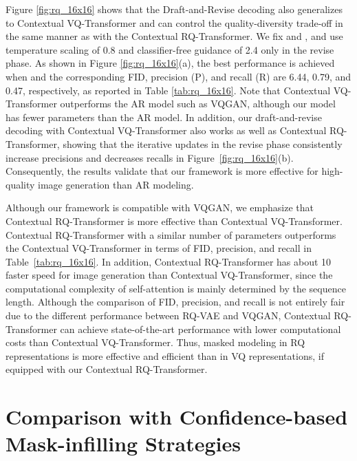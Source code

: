 \documentclass{article}
\begin{document}
Figure \ref{fig:rq_16x16} shows that the Draft-and-Revise decoding also generalizes to Contextual VQ-Transformer and can control the quality-diversity trade-off in the same manner as with the Contextual RQ-Transformer. 
We fix  and , and use temperature scaling of 0.8 and classifier-free guidance of 2.4 only in the revise phase. 
As shown in Figure \ref{fig:rq_16x16}(a), the best performance is achieved when  and the corresponding FID, precision (P), and recall (R) are 6.44, 0.79, and 0.47, respectively, as reported in Table \ref{tab:rq_16x16}.
Note that Contextual VQ-Transformer outperforms the AR model such as VQGAN, although our model has  fewer parameters than the AR model.
In addition, our draft-and-revise decoding with Contextual VQ-Transformer also works as well as Contextual RQ-Transformer, showing that the iterative updates in the revise phase consistently increase precisions and decreases recalls in Figure~\ref{fig:rq_16x16}(b).
Consequently, the results validate that our framework is more effective for high-quality image generation than AR modeling.

Although our framework is compatible with VQGAN, we emphasize that Contextual RQ-Transformer is more effective than Contextual VQ-Transformer.
Contextual RQ-Transformer with a similar number of parameters outperforms the Contextual VQ-Transformer in terms of FID, precision, and recall in Table~\ref{tab:rq_16x16}.
In addition, Contextual RQ-Transformer has about 10 faster speed for image generation than Contextual VQ-Transformer, since the computational complexity of self-attention is mainly determined by the sequence length.
Although the comparison of FID, precision, and recall is not entirely fair due to the different performance between RQ-VAE and VQGAN, Contextual RQ-Transformer can achieve state-of-the-art performance with lower computational costs than Contextual VQ-Transformer.
Thus, masked modeling in RQ representations is more effective and efficient than in VQ representations, if equipped with our Contextual RQ-Transformer.




\section{Comparison with Confidence-based Mask-infilling Strategies}
\end{document}
